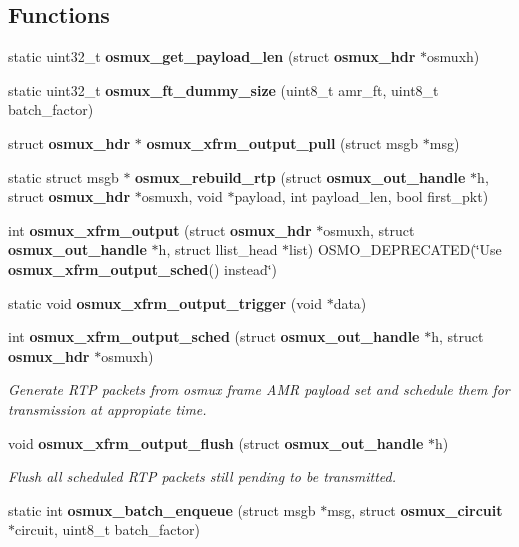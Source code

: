 \subsection*{Functions}
\begin{DoxyCompactItemize}
\item 
static uint32\+\_\+t {\bfseries osmux\+\_\+get\+\_\+payload\+\_\+len} (struct {\bf osmux\+\_\+hdr} $\ast$osmuxh)
\item 
static uint32\+\_\+t {\bfseries osmux\+\_\+ft\+\_\+dummy\+\_\+size} (uint8\+\_\+t amr\+\_\+ft, uint8\+\_\+t batch\+\_\+factor)
\item 
struct {\bf osmux\+\_\+hdr} $\ast$ {\bfseries osmux\+\_\+xfrm\+\_\+output\+\_\+pull} (struct msgb $\ast$msg)
\item 
static struct msgb $\ast$ {\bfseries osmux\+\_\+rebuild\+\_\+rtp} (struct {\bf osmux\+\_\+out\+\_\+handle} $\ast$h, struct {\bf osmux\+\_\+hdr} $\ast$osmuxh, void $\ast$payload, int payload\+\_\+len, bool first\+\_\+pkt)
\item 
int {\bfseries osmux\+\_\+xfrm\+\_\+output} (struct {\bf osmux\+\_\+hdr} $\ast$osmuxh, struct {\bf osmux\+\_\+out\+\_\+handle} $\ast$h, struct llist\+\_\+head $\ast$list) O\+S\+M\+O\+\_\+\+D\+E\+P\+R\+E\+C\+A\+T\+ED(\char`\"{}Use {\bf osmux\+\_\+xfrm\+\_\+output\+\_\+sched}() instead\char`\"{})
\item 
static void {\bfseries osmux\+\_\+xfrm\+\_\+output\+\_\+trigger} (void $\ast$data)
\item 
int {\bf osmux\+\_\+xfrm\+\_\+output\+\_\+sched} (struct {\bf osmux\+\_\+out\+\_\+handle} $\ast$h, struct {\bf osmux\+\_\+hdr} $\ast$osmuxh)
\begin{DoxyCompactList}\small\item\em Generate R\+TP packets from osmux frame A\+MR payload set and schedule them for transmission at appropiate time. \end{DoxyCompactList}\item 
void {\bf osmux\+\_\+xfrm\+\_\+output\+\_\+flush} (struct {\bf osmux\+\_\+out\+\_\+handle} $\ast$h)
\begin{DoxyCompactList}\small\item\em Flush all scheduled R\+TP packets still pending to be transmitted. \end{DoxyCompactList}\item 
static int {\bfseries osmux\+\_\+batch\+\_\+enqueue} (struct msgb $\ast$msg, struct {\bf osmux\+\_\+circuit} $\ast$circuit, uint8\+\_\+t batch\+\_\+factor)
\item 

\end{DoxyCompactItemize}
